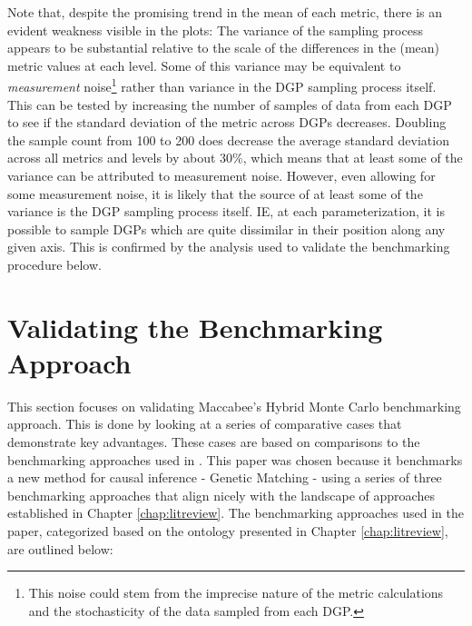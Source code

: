 \documentclass[../main.tex]{subfiles}
\begin{document}
Note that, despite the promising trend in the mean of each metric, there is an evident weakness visible in the plots: The variance of the sampling process appears to be substantial relative to the scale of the differences in the (mean) metric values at each level. Some of this variance may be equivalent to \textit{measurement} noise\footnote{This noise could stem from the imprecise nature of the metric calculations and the stochasticity of the data sampled from each DGP.} rather than variance in the DGP sampling process itself. This can be tested by increasing the number of samples of data from each DGP to see if the standard deviation of the metric across DGPs decreases. Doubling the sample count from 100 to 200 does decrease the average standard deviation across all metrics and levels by about 30\%, which means that at least some of the variance can be attributed to measurement noise. However, even allowing for some measurement noise, it is likely that the source of at least some of the variance is the DGP sampling process itself. IE, at each parameterization, it is possible to sample DGPs which are quite dissimilar in their position along any given axis. This is confirmed by the analysis used to validate the benchmarking procedure below.

\section{Validating the Benchmarking Approach}

This section focuses on validating Maccabee's Hybrid Monte Carlo benchmarking approach. This is done by looking at a series of comparative cases that demonstrate key advantages. These cases are based on comparisons to the benchmarking approaches used in \textcite{Diamond2013GeneticStudies}. This paper was chosen because it benchmarks a new method for causal inference - Genetic Matching - using a series of three benchmarking approaches that align nicely with the landscape of approaches established in Chapter \ref{chap:litreview}. The benchmarking approaches used in the paper, categorized based on the ontology presented in Chapter \ref{chap:litreview}, are outlined below:
\end{document}
